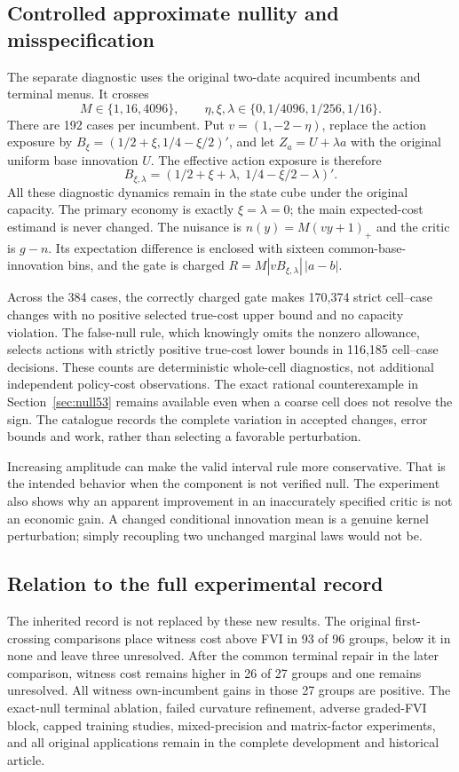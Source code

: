 \subsection{Controlled approximate nullity and misspecification}
The separate diagnostic uses the original two-date acquired incumbents and terminal menus. It crosses
\[
 M\in\{1,16,4096\},\qquad
 \eta,\xi,\lambda\in\{0,1/4096,1/256,1/16\}.
\]
There are 192 cases per incumbent. Put $v=(1,-2-\eta)$, replace the action exposure by $B_\xi=(1/2+\xi,1/4-\xi/2)'$, and let $Z_a=U+\lambda a$ with the original uniform base innovation $U$. The effective action exposure is therefore
\[
 B_{\xi,\lambda}=(1/2+\xi+\lambda,\;1/4-\xi/2-\lambda)' .
\]
All these diagnostic dynamics remain in the state cube under the original capacity. The primary economy is exactly $\xi=\lambda=0$; the main expected-cost estimand is never changed. The nuisance is $n(y)=M(vy+1)_+$ and the critic is $g-n$. Its expectation difference is enclosed with sixteen common-base-innovation bins, and the gate is charged
$R=M|vB_{\xi,\lambda}|\,|a-b|$.


Across the 384 cases, the correctly charged gate makes 170,374 strict cell--case changes with no positive selected true-cost upper bound and no capacity violation. The false-null rule, which knowingly omits the nonzero allowance, selects actions with strictly positive true-cost lower bounds in 116,185 cell--case decisions. These counts are deterministic whole-cell diagnostics, not additional independent policy-cost observations. The exact rational counterexample in Section~\ref{sec:null53} remains available even when a coarse cell does not resolve the sign. The catalogue records the complete variation in accepted changes, error bounds and work, rather than selecting a favorable perturbation.

Increasing amplitude can make the valid interval rule more conservative. That is the intended behavior when the component is not verified null. The experiment also shows why an apparent improvement in an inaccurately specified critic is not an economic gain. A changed conditional innovation mean is a genuine kernel perturbation; simply recoupling two unchanged marginal laws would not be.

\subsection{Relation to the full experimental record}
The inherited record is not replaced by these new results. The original first-crossing comparisons place witness cost above FVI in 93 of 96 groups, below it in none and leave three unresolved. After the common terminal repair in the later comparison, witness cost remains higher in 26 of 27 groups and one remains unresolved. All witness own-incumbent gains in those 27 groups are positive. The exact-null terminal ablation, failed curvature refinement, adverse graded-FVI block, capped training studies, mixed-precision and matrix-factor experiments, and all original applications remain in the complete development and historical article.

